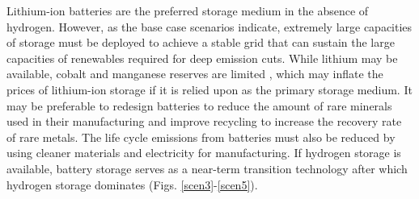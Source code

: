 Lithium-ion batteries are the preferred storage medium in the absence of hydrogen. However, as the base case scenarios indicate, extremely large capacities of storage must be deployed to achieve a stable grid that can sustain the large capacities of renewables required for deep emission cuts. While lithium may be available, cobalt and manganese reserves are limited \cite{scrosati_lithium-ion_2011,simon_potential_2015,turcheniuk_ten_2018} , which may inflate the prices of lithium-ion storage if it is relied upon as the primary storage medium. It may be preferable to redesign batteries to reduce the amount of rare minerals used in their manufacturing and improve recycling to increase the recovery rate of rare metals. The life cycle emissions from batteries must also be reduced by using cleaner materials and electricity for manufacturing. If hydrogen storage is available, battery storage serves as a near-term transition technology after which hydrogen storage dominates (Figs. \ref{scen3}-\ref{scen5}).

